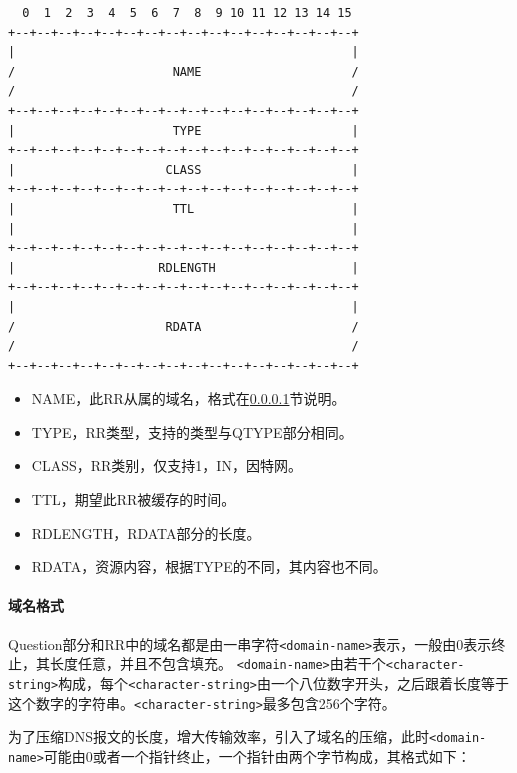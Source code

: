 \documentclass[lang=cn,11pt,a4paper,cite=authornum]{paper}
\begin{document}
\begin{code}
\begin{verbatim}
  0  1  2  3  4  5  6  7  8  9 10 11 12 13 14 15
+--+--+--+--+--+--+--+--+--+--+--+--+--+--+--+--+
|                                               |
/                      NAME                     /
/                                               /
+--+--+--+--+--+--+--+--+--+--+--+--+--+--+--+--+
|                      TYPE                     |
+--+--+--+--+--+--+--+--+--+--+--+--+--+--+--+--+
|                     CLASS                     |
+--+--+--+--+--+--+--+--+--+--+--+--+--+--+--+--+
|                      TTL                      |
|                                               |
+--+--+--+--+--+--+--+--+--+--+--+--+--+--+--+--+
|                    RDLENGTH                   |
+--+--+--+--+--+--+--+--+--+--+--+--+--+--+--+--+
|                                               |
/                     RDATA                     /
/                                               /
+--+--+--+--+--+--+--+--+--+--+--+--+--+--+--+--+
\end{verbatim}
\end{code}

\begin{itemize}
    \item NAME，此RR从属的域名，格式在\ref{name_format}节说明。
    \item TYPE，RR类型，支持的类型与QTYPE部分相同。
    \item CLASS，RR类别，仅支持1，IN，因特网。
    \item TTL，期望此RR被缓存的时间。
    \item RDLENGTH，RDATA部分的长度。
    \item RDATA，资源内容，根据TYPE的不同，其内容也不同。
\end{itemize}

\paragraph{域名格式}
\label{name_format}

Question部分和RR中的域名都是由一串字符\texttt{<domain-name>}表示，一般由0表示终止，其长度任意，并且不包含填充。
\texttt{<domain-name>}由若干个\texttt{<character-string>}构成，每个\texttt{<character-string>}由一个八位数字开头，之后跟着长度等于这个数字的字符串。\texttt{<character-string>}最多包含256个字符。

为了压缩DNS报文的长度，增大传输效率，引入了域名的压缩，此时\texttt{<domain-name>}可能由0或者一个指针终止，一个指针由两个字节构成，其格式如下：
\end{document}
